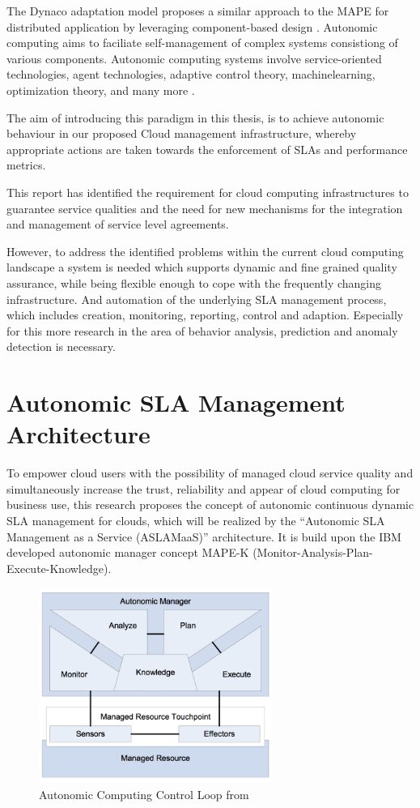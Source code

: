 The Dynaco adaptation model proposes a similar approach to the MAPE for distributed application by leveraging component-based design \citep{buisson2005dynamic} \citep{buisson2006adaptation}. Autonomic computing aims to faciliate self-management of complex systems consistiong of various components. Autonomic computing systems involve service-oriented technologies, agent technologies, adaptive control theory, machinelearning, optimization theory, and many more \citep{fei2005design} \citep{zhao2009survey}. 
 
The aim of introducing this paradigm in this thesis, is to achieve autonomic behaviour in our proposed Cloud management infrastructure, whereby appropriate actions are taken towards the enforcement of SLAs and performance metrics.

This report has identified the requirement for cloud computing infrastructures to guarantee service qualities and the need for new mechanisms for the integration and management of service level agreements. 


However, to address the identified problems within the current cloud computing landscape a system is needed which supports dynamic and fine grained quality assurance, while being flexible enough to cope with the frequently changing infrastructure. And automation of the underlying SLA management process, which includes creation,  monitoring, reporting, control and adaption. Especially for this more research in the area of behavior analysis, prediction and anomaly detection is necessary.

\section{Autonomic SLA Management Architecture}
To empower cloud users with the possibility of  managed cloud service quality and simultaneously increase the trust, reliability and appear of cloud computing for business use, this research proposes the concept of autonomic continuous dynamic SLA management for clouds, which will be realized by the “Autonomic SLA Management as a Service (ASLAMaaS)” architecture. It is build upon the IBM developed autonomic manager concept MAPE-K \cite{MAPE-K} (Monitor-Analysis-Plan-Execute-Knowledge).

\begin{figure}[!ht]
\centering
\includegraphics[width=3in]{chapters/chapter4/fig/MAPE.PNG}
\caption{Autonomic Computing Control Loop from \cite{MAPE-K}}
\label{fig_MAPE}
\end{figure}

